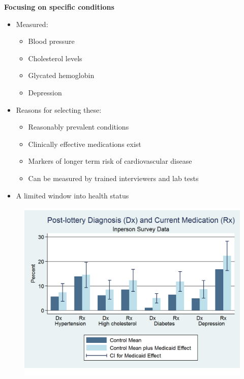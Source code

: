 \documentclass[notes=show]{beamer}
\begin{document}
\begin{frame}[plain]
	\begin{center}
	\textbf{Focusing on specific conditions}
	\end{center}
	
	\begin{itemize}
	\item Measured:
		\begin{itemize}
		\item Blood pressure
		\item Cholesterol levels
		\item Glycated hemoglobin
		\item Depression
		\end{itemize}
	\item Reasons for selecting these:
		\begin{itemize}
		\item Reasonably prevalent conditions
		\item Clinically effective medications exist
		\item Markers of longer term risk of cardiovascular disease
		\item Can be measured by trained interviewers and lab tests
		\end{itemize}
	\item A limited window into health status
	\end{itemize}
\end{frame}

\begin{frame}[plain]
	
	\begin{figure}
	\includegraphics[scale=0.40]{./lecture_includes/baicker_14.pdf}
	\end{figure}
\end{frame}
\end{document}
